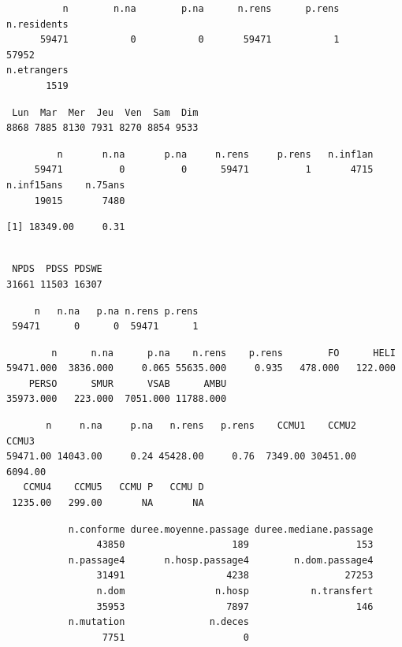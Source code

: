 \documentclass[]{article}
\begin{document}
\begin{verbatim}
          n        n.na        p.na      n.rens      p.rens n.residents 
      59471           0           0       59471           1       57952 
n.etrangers 
       1519 
\end{verbatim}

\begin{verbatim}
 Lun  Mar  Mer  Jeu  Ven  Sam  Dim 
8868 7885 8130 7931 8270 8854 9533 
\end{verbatim}

\begin{verbatim}
         n       n.na       p.na     n.rens     p.rens   n.inf1an 
     59471          0          0      59471          1       4715 
n.inf15ans    n.75ans 
     19015       7480 
\end{verbatim}

\begin{verbatim}
[1] 18349.00     0.31
\end{verbatim}

\begin{verbatim}

 NPDS  PDSS PDSWE 
31661 11503 16307 
\end{verbatim}

\begin{verbatim}
     n   n.na   p.na n.rens p.rens 
 59471      0      0  59471      1 
\end{verbatim}

\begin{verbatim}
        n      n.na      p.na    n.rens    p.rens        FO      HELI 
59471.000  3836.000     0.065 55635.000     0.935   478.000   122.000 
    PERSO      SMUR      VSAB      AMBU 
35973.000   223.000  7051.000 11788.000 
\end{verbatim}

\begin{verbatim}
       n     n.na     p.na   n.rens   p.rens    CCMU1    CCMU2    CCMU3 
59471.00 14043.00     0.24 45428.00     0.76  7349.00 30451.00  6094.00 
   CCMU4    CCMU5   CCMU P   CCMU D 
 1235.00   299.00       NA       NA 
\end{verbatim}

\begin{verbatim}
           n.conforme duree.moyenne.passage duree.mediane.passage 
                43850                   189                   153 
           n.passage4       n.hosp.passage4        n.dom.passage4 
                31491                  4238                 27253 
                n.dom                n.hosp           n.transfert 
                35953                  7897                   146 
           n.mutation               n.deces 
                 7751                     0 
\end{verbatim}
\end{document}
